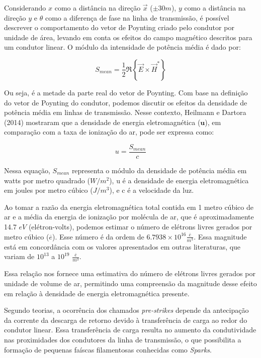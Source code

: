 \documentclass[a4paper, 12pt, onecolumn,singlespacing]{article}
\begin{document}
		Considerando $x$ como a distância na direção $\vec x$  ($\pm 30m$), $y$ como a distância na direção $y$ e $\theta$ como a diferença de fase na linha de transmissão, é possível descrever o comportamento do vetor de Poynting criado pelo condutor por unidade de área, levando em conta os efeitos do campo magnético descritos para um condutor linear. O módulo da intensidade de potência média é dado por:
		
		\begin{equation}
			S_{mean} = \frac{1}{2} \Re{ \left\{\vec E \times \vec H^{*}\right\}}
		\end{equation}
		
		Ou seja, é a metade da parte real do vetor de Poynting. Com base na definição do vetor de Poynting do condutor, podemos discutir os efeitos da densidade de potência média em linhas de transmissão. Nesse contexto, Heilmann e Dartora (2014) mostraram que a densidade de energia eletromagnética ($\mathbf u$), em comparação com a taxa de ionização do ar, pode ser expressa como:
		
		\begin{equation}
			u = \frac{S_{mean}}{c}
		\end{equation}
		
		Nessa equação, $S_{mean}$ representa o módulo da densidade de potência média em watts por metro quadrado ($W/m^2$), u é a densidade de energia eletromagnética em joules por metro cúbico ($J/m^3$), e c é a velocidade da luz.
		
		Ao tomar a razão da energia eletromagnética total contida em 1 metro cúbico de ar e a média da energia de ionização por molécula de ar, que é aproximadamente 14.7 $eV$ (elétron-volts), podemos estimar o número de elétrons livres gerados por metro cúbico ($\overline{e}$). Esse número é da ordem de $6.7938 \times 10^{16} \frac{\overline{e}}{m^3}$. Essa magnitude está em concordância com os valores apresentados em outras literaturas, que variam de $10^13$ a $10^19$ $\frac{\overline{e}}{m^3}$.
		
		Essa relação nos fornece uma estimativa do número de elétrons livres gerados por unidade de volume de ar, permitindo uma compreensão da magnitude desse efeito em relação à densidade de energia eletromagnética presente. 
		
		Segundo teorias, a ocorrência dos chamados \textit{pre-strikes} depende da antecipação da corrente da descarga de retorno devido à transferência de carga ao redor do condutor linear. Essa transferência de carga resulta no aumento da condutividade nas proximidades dos condutores da linha de transmissão, o que possibilita a formação de pequenas faíscas filamentosas conhecidas como \textit{Sparks}.
		
\end{document}
